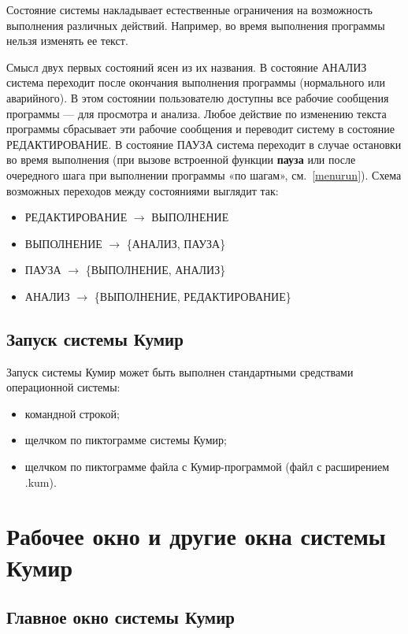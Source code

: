 \documentclass[12pt,a4paper]{article}
\begin{document}
Состояние системы накладывает естественные ограничения на возможность выполнения различных действий. Например, во время выполнения программы нельзя изменять ее текст. 

Смысл двух первых состояний ясен из их названия.  В состояние АНАЛИЗ  система переходит после окончания выполнения программы (нормального или аварийного). В этом состоянии пользователю доступны все рабочие сообщения программы --- для просмотра и анализа. Любое действие по изменению текста программы сбрасывает эти рабочие сообщения и переводит систему в состояние РЕДАКТИРОВАНИЕ. В состояние ПАУЗА система переходит в случае остановки во время выполнения (при вызове встроенной функции \textsf{\textbf{\mbox{пауза}}} или после очередного шага при выполнении программы «по шагам», см.~\ref{menurun}). Схема возможных переходов между состояниями выглядит так:
\begin{itemize}
\item РЕДАКТИРОВАНИЕ $\to$ ВЫПОЛНЕНИЕ
\item ВЫПОЛНЕНИЕ  $\to$ \{АНАЛИЗ, ПАУЗА\}
\item ПАУЗА $\to$ \{ВЫПОЛНЕНИЕ,  АНАЛИЗ\}
\item АНАЛИЗ  $\to$ \{ВЫПОЛНЕНИЕ,  РЕДАКТИРОВАНИЕ\}
\end{itemize}

\subsection{Запуск системы Кумир}

Запуск системы Кумир может быть выполнен стандартными средствами операционной системы:
\begin{itemize}
\item командной строкой;
\item щелчком по пиктограмме системы Кумир;
\item щелчком по пиктограмме файла с Кумир-программой (файл с расширением .kum).
\end{itemize}

\section{Рабочее окно и другие окна системы Кумир}
\label{windows}

\subsection{Главное окно системы Кумир}
\end{document}

